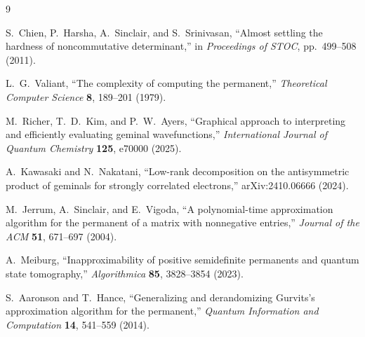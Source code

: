 \documentclass[11pt]{article}
\begin{document}
\begin{thebibliography}{9}

S.~Chien, P.~Harsha, A.~Sinclair, and S.~Srinivasan,
``Almost settling the hardness of noncommutative determinant,''
in \emph{Proceedings of STOC}, pp.~499--508 (2011).

L.~G.~Valiant,
``The complexity of computing the permanent,''
\emph{Theoretical Computer Science} \textbf{8}, 189--201 (1979).

M.~Richer, T.~D.~Kim, and P.~W.~Ayers,
``Graphical approach to interpreting and efficiently evaluating geminal
wavefunctions,''
\emph{International Journal of Quantum Chemistry} \textbf{125}, e70000
(2025).

A.~Kawasaki and N.~Nakatani,
``Low-rank decomposition on the antisymmetric product of geminals for strongly
correlated electrons,'' arXiv:2410.06666 (2024).

M.~Jerrum, A.~Sinclair, and E.~Vigoda,
``A polynomial-time approximation algorithm for the permanent of a matrix
with nonnegative entries,''
\emph{Journal of the ACM} \textbf{51}, 671--697 (2004).

A.~Meiburg,
``Inapproximability of positive semidefinite permanents and quantum state
tomography,''
\emph{Algorithmica} \textbf{85}, 3828--3854 (2023).

S.~Aaronson and T.~Hance,
``Generalizing and derandomizing Gurvits's approximation algorithm for the
permanent,''
\emph{Quantum Information and Computation} \textbf{14}, 541--559 (2014).

\end{thebibliography}
\end{document}

